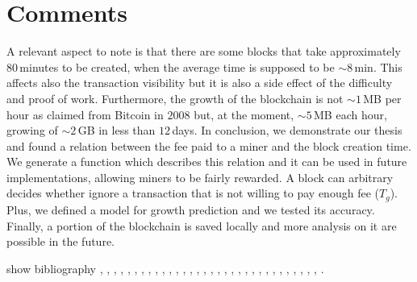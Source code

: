 \documentclass[USenglish]{uit-thesis}
\begin{document}
\section{Comments}
\label{sec:comments}
A relevant aspect to note is that there are some blocks
that take approximately $80$\,minutes to be created, when the
average time is supposed to be $\sim8$\,min. This affects also the
transaction visibility but it is also a side effect of the difficulty
and proof of work. Furthermore, the growth of the blockchain
is not $\sim1$\,MB per hour as claimed from Bitcoin in $2008$
but, at the moment, $\sim5$\,MB each hour, growing of $\sim2$\,GB in less than $12$\,days.
In conclusion, we demonstrate our thesis and found a relation between the fee paid to a miner
and the block creation time. We generate a function which describes this relation and it can
be used in future implementations, allowing miners to be fairly rewarded.
A block can arbitrary decides whether ignore a transaction
that is not willing to pay enough fee ($T_g$).
Plus, we defined a model for growth prediction and we tested its accuracy. Finally, a portion of
the blockchain is saved locally and more analysis on it are possible in the future.

show bibliography \cite{bitcoin}, \cite{ethereum}, \cite{hashcash},
\cite{proof-of-work}, \cite{smartcontracts}, \cite{stepbystep_smartcontracts},
\cite{ethereum_white_paper}, \cite{ethereum_solidity}, \cite{resource_exhaustion_asttacks},
\cite{sha}, \cite{automata}, \cite{fireflies}, \cite{bitcoinmining}, \cite{byzantium}, \cite{hrdb},
\cite{mitra}, \cite{bitcoin_api}, \cite{ethereum_api}, \cite{merkle_tree}, \cite{ethereum_wiki_patricia_tree},
\cite{blockchain}, \cite{distributed_communication}, \cite{cryptography}, \cite{bitcoin_blockchain}, \cite{ethereum_bc_analysis}, \cite{ethereum_blockchain}, \cite{bitcoinmining_process},
\cite{proof-of-work}, \cite{tradeblock}, \cite{ethereum_website}, \cite{design_pattern},
\cite{reg_ex}, \cite{matplotlib}.




\end{document}
